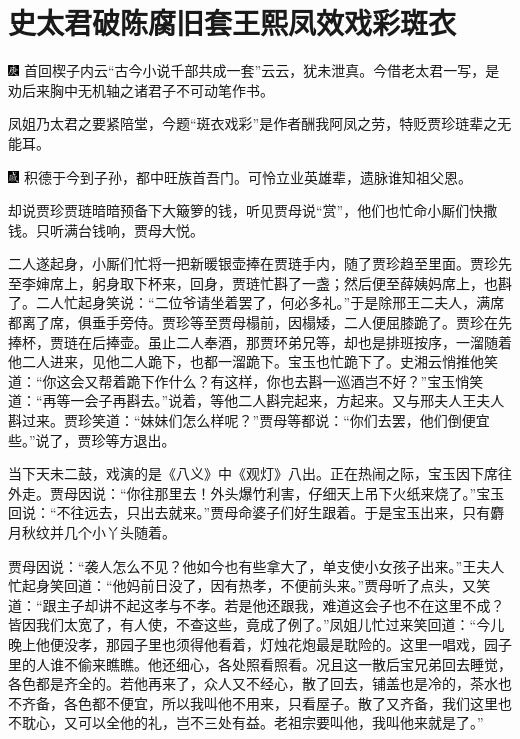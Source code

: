 

\chapter{史太君破陈腐旧套\hspace{.5em}王熙凤效戏彩斑衣}

{\includegraphics[width=3mm]{../Images/00004}  \kaishu 首回楔子内云``古今小说千部共成一套''云云，犹未泄真。今借老太君一写，是劝后来胸中无机轴之诸君子不可动笔作书。}

{凤姐乃太君之要紧陪堂，今题``斑衣戏彩''是作者酬我阿凤之劳，特贬贾珍琏辈之无能耳。}

{\includegraphics[width=3mm]{../Images/00005}  \kaishu 积德于今到子孙，都中旺族首吾门。可怜立业英雄辈，遗脉谁知祖父恩。}

却说贾珍贾琏暗暗预备下大簸箩的钱，听见贾母说``赏''，他们也忙命小厮们快撒钱。只听满台钱响，贾母大悦。

二人遂起身，小厮们忙将一把新暖银壶捧在贾琏手内，随了贾珍趋至里面。贾珍先至李婶席上，躬身取下杯来，回身，贾琏忙斟了一盏；然后便至薛姨妈席上，也斟了。二人忙起身笑说：``二位爷请坐着罢了，何必多礼。''于是除邢王二夫人，满席都离了席，俱垂手旁侍。贾珍等至贾母榻前，因榻矮，二人便屈膝跪了。贾珍在先捧杯，贾琏在后捧壶。虽止二人奉酒，那贾环弟兄等，却也是排班按序，一溜随着他二人进来，见他二人跪下，也都一溜跪下。宝玉也忙跪下了。史湘云悄推他笑道：``你这会又帮着跪下作什么？有这样，你也去斟一巡酒岂不好？''宝玉悄笑道：``再等一会子再斟去。''说着，等他二人斟完起来，方起来。又与邢夫人王夫人斟过来。贾珍笑道：``妹妹们怎么样呢？''贾母等都说：``你们去罢，他们倒便宜些。''说了，贾珍等方退出。

当下天未二鼓，戏演的是《八义》中《观灯》八出。正在热闹之际，宝玉因下席往外走。贾母因说：``你往那里去！外头爆竹利害，仔细天上吊下火纸来烧了。''宝玉回说：``不往远去，只出去就来。''贾母命婆子们好生跟着。于是宝玉出来，只有麝月秋纹并几个小丫头随着。

贾母因说：``袭人怎么不见？他如今也有些拿大了，单支使小女孩子出来。''王夫人忙起身笑回道：``他妈前日没了，因有热孝，不便前头来。''贾母听了点头，又笑道：``跟主子却讲不起这孝与不孝。若是他还跟我，难道这会子也不在这里不成？皆因我们太宽了，有人使，不查这些，竟成了例了。''凤姐儿忙过来笑回道：``今儿晚上他便没孝，那园子里也须得他看着，灯烛花炮最是耽险的。这里一唱戏，园子里的人谁不偷来瞧瞧。他还细心，各处照看照看。况且这一散后宝兄弟回去睡觉，各色都是齐全的。若他再来了，众人又不经心，散了回去，铺盖也是冷的，茶水也不齐备，各色都不便宜，所以我叫他不用来，只看屋子。散了又齐备，我们这里也不耽心，又可以全他的礼，岂不三处有益。老祖宗要叫他，我叫他来就是了。''

